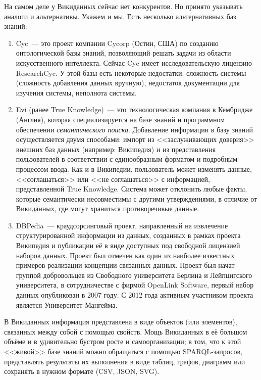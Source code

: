 На самом деле у Викиданных сейчас нет конкурентов. Но принято указывать аналоги и альтернативы. Укажем и мы. Есть несколько альтернативных баз знаний:
\begin{enumerate}
\item Cyc~--- это проект компании Cycorp (Остин, США) по созданию онтологической базы знаний, позволяющий решать задачи из области искусственного интеллекта\cite{Cyc}. Сейчас Cyc имеет исследовательскую лицензию ResearchCyc. У этой базы есть некоторые недостатки: сложность системы (сложность добавления данных
вручную), недостаток документации для изучения системы, неполнота системы.
\item Evi (ранее True Knowledge\cite{True_Knowledge})~--- это технологическая компания в Кембридже (Англия), которая специализируется на базе знаний и программном обеспечении \textit{семантического поиска}\footnotemark.  Добавление информации в базу знаний осуществляется двумя способами: импорт из <<заслуживающих доверия>> внешних баз данных (например: Википедия) и из представления пользователей в соответствии с единообразным форматом и подробным процессом ввода. Как и в Википедии, пользователь может изменять
данные, <<соглашаться>> или <<не соглашаться>> с информацией, представленной True Knowledge. Система может отклонить любые факты, которые семантически несовместимы с другими утверждениями, в отличие от Викиданных, где могут
храниться противоречивые данные.
\item DBPedia~--- краудсорсинговый проект, направленный на извлечение структурированной информации из данных, созданных в рамках проекта Википедия и публикации её в виде доступных под свободной лицензией наборов данных. Проект был отмечен как один из наиболее известных примеров реализации концепции связанных данных.
Проект был начат группой добровольцев из Свободного университета Берлина и Лейпцигского университета, в сотрудничестве с фирмой OpenLink Software, первый набор данных опубликован в 2007 году. С 2012 года активным участником проекта является Университет Мангейма.
\end{enumerate}
В Викиданных информация представлена в виде объектов (или элементов), связанных между собой с помощью свойств\footnotemark {}. Мощь Викиданных в её большом объёме и в удивительно бустром росте и самоорганизации; в том, что к этой <<живой>> базе знаний можно обращаться с помощью  SPARQL-запросов, представлять результаты их выполнения в виде таблиц, графов, диаграмм или сохранять в нужном формате (CSV, JSON, SVG).


